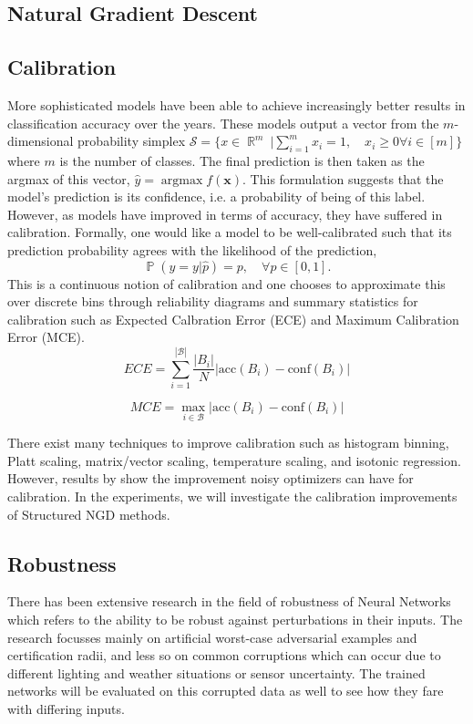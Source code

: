 \documentclass[a4paper, 11pt, oneside]{scrartcl}
\theoremstyle{break}
\DeclareMathOperator*{\argmax}{argmax}
\DeclareMathOperator{\Real}{\mathbb{R}}
\DeclareMathOperator{\Prob}{\mathbb{P}}
\newcommand{\matr}[1]{\boldsymbol{#1}}
\newcommand{\set}[1]{\mathcal{#1}}
\numberwithin{equation}{section}
\begin{document}
		\subsection{Natural Gradient Descent}


		\subsection{Calibration}
			More sophisticated models have been able to achieve increasingly better results in classification accuracy over the years.
			These models output a vector from the $m$-dimensional probability simplex $\set{S} = \{x \in \Real^m\ | \sum_{i=1}^m x_i = 1, \quad x_i \ge 0 \forall i \in [m]\}$ where $m$ is the number of classes.
			The final prediction is then taken as the argmax of this vector, $\hat{y} = \argmax f(\matr{x})$.
			This formulation suggests that the model's prediction is its confidence, i.e. a probability of being of this label.
			However, as models have improved in terms of accuracy, they have suffered in calibration.
			Formally, one would like a model to be well-calibrated such that its prediction probability agrees with the likelihood of the prediction,
			\begin{equation}
				\Prob (\hat{y} = y | \hat{p}) = p, \quad \forall p \in [0, 1].
				\label{eqn:calibration}
			\end{equation}
			This is a continuous notion of calibration and one chooses to approximate this over discrete bins through reliability diagrams and summary statistics for calibration such as Expected Calbration Error (ECE) and Maximum Calibration Error (MCE).
			\begin{equation}
				ECE = \sum_{i=1}^{|\set{B}|} \frac{|B_i|}{N} \left| \text{acc}(B_i) - \text{conf}(B_i) \right|
				\label{eqn:ECE}
			\end{equation}

			\begin{equation}
				MCE = \max_{i \in \set{B}} \left| \text{acc}(B_i) - \text{conf}(B_i) \right|
				\label{eqn:MCE}
			\end{equation}

			There exist many techniques to improve calibration such as histogram binning, Platt scaling, matrix/vector scaling, temperature scaling, and isotonic regression.
			However, results by \parencite{ZSD+17} show the improvement noisy optimizers can have for calibration.
			In the experiments, we will investigate the calibration improvements of Structured NGD methods.
		\subsection{Robustness}
			There has been extensive research in the field of robustness of Neural Networks which refers to the ability to be robust against perturbations in their inputs.
			The research focusses mainly on artificial worst-case adversarial examples and certification radii, and less so on common corruptions which can occur due to different lighting and weather situations or sensor uncertainty.
			The trained networks will be evaluated on this corrupted data as well to see how they fare with differing inputs.
\end{document}
